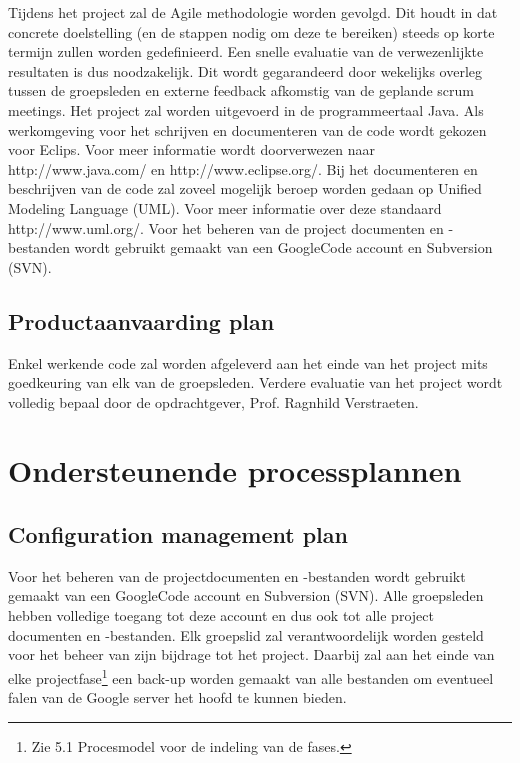 \documentclass{article}
\begin{document}
Tijdens het project zal de Agile methodologie worden gevolgd. Dit houdt in dat concrete doelstelling (en de stappen nodig om deze te bereiken) steeds op korte termijn zullen worden gedefinieerd. Een snelle evaluatie van de verwezenlijkte resultaten is dus noodzakelijk. Dit wordt gegarandeerd door wekelijks overleg tussen de groepsleden en externe feedback afkomstig van de geplande scrum meetings.
Het project zal worden uitgevoerd in de programmeertaal Java. Als werkomgeving voor het schrijven en documenteren van de code wordt gekozen voor Eclips. Voor meer informatie wordt doorverwezen naar http://www.java.com/ en http://www.eclipse.org/.
Bij het documenteren en beschrijven van de code zal zoveel mogelijk beroep worden gedaan op Unified Modeling Language (UML). Voor meer informatie over deze standaard http://www.uml.org/. Voor het beheren van de project documenten en -bestanden wordt gebruikt gemaakt van een GoogleCode account en Subversion (SVN).


\subsection{Productaanvaarding plan}

Enkel werkende code zal worden afgeleverd aan het einde van het project mits goedkeuring van elk van de groepsleden. Verdere evaluatie van het project wordt volledig bepaal door de opdrachtgever, Prof. Ragnhild Verstraeten.

\newpage
\section{Ondersteunende processplannen}
\subsection{Configuration management plan}

Voor het beheren van de projectdocumenten en -bestanden wordt gebruikt gemaakt van een GoogleCode account en Subversion (SVN). Alle groepsleden hebben volledige toegang tot deze account en dus ook tot alle project documenten en -bestanden. Elk groepslid zal verantwoordelijk worden gesteld voor het beheer van zijn bijdrage tot het project. Daarbij zal aan het einde van elke projectfase\footnote{Zie 5.1 Procesmodel  voor de indeling van de fases.} een back-up worden gemaakt van alle bestanden om eventueel falen van de Google server het hoofd te kunnen bieden.
\end{document}
